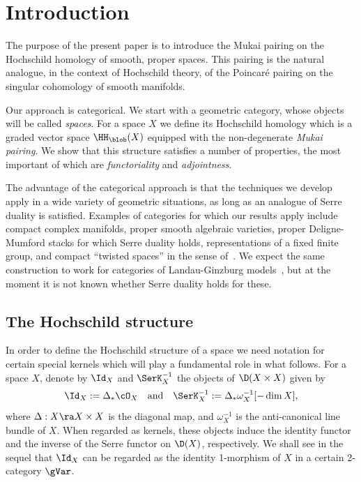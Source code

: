 \section*{Introduction}
\label{sec:intro}


The purpose of the present paper is to introduce the Mukai pairing on
the Hochschild homology of smooth, proper spaces.  This pairing is the
natural analogue, in the context of Hochschild theory, of the
Poincar\'e pairing on the singular cohomology of smooth manifolds.

Our approach is categorical.  We start with a geometric category,
whose objects will be called {\em spaces}.  For a space $X$ we define
its Hochschild homology which is a graded vector space $\HH_\blob(X)$
equipped with the non-degenerate \emph{Mukai pairing}.  We show that
this structure satisfies a number of properties, the most important of
which are {\em functoriality} and {\em adjointness}.

The advantage of the categorical approach is that the techniques we
develop apply in a wide variety of geometric situations, as long as an
analogue of Serre duality is satisfied.  Examples of categories for
which our results apply include compact complex manifolds, proper
smooth algebraic varieties, proper Deligne-Mumford stacks for which
Serre duality holds, representations of a fixed finite group, and
compact ``twisted spaces'' in the sense of~\cite{Cal}.  We expect the
same construction to work for categories of Landau-Ginzburg
models~\cite{Orl}, but at the moment it is not known whether Serre
duality holds for these.

\subsection*{The Hochschild structure}
\label{subsec:hochstr}
In order to define the Hochschild structure of a space we need
notation for certain special kernels which will play a fundamental
role in what follows.  For a space $X$, denote by $\Id_X$ and
$\SerK_X^{-1}$ the objects of $\D(X\times X)$ given by
\[ \Id_X := \Delta_* \cO_X \quad\mbox{and}\quad \SerK_X^{-1} :=
\Delta_* \omega_X^{-1}[-\dim X], \] 
where $\Delta:X \ra X\times X$ is the diagonal map, and
$\omega_X^{-1}$ is the anti-canonical line bundle of $X$.  When
regarded as kernels, these objects induce the identity functor and the
inverse of the Serre functor on $\D(X)$, respectively.  We shall see
in the sequel that $\Id_X$ can be regarded as the identity 1-morphism
of $X$ in a certain 2-category $\gVar$.

